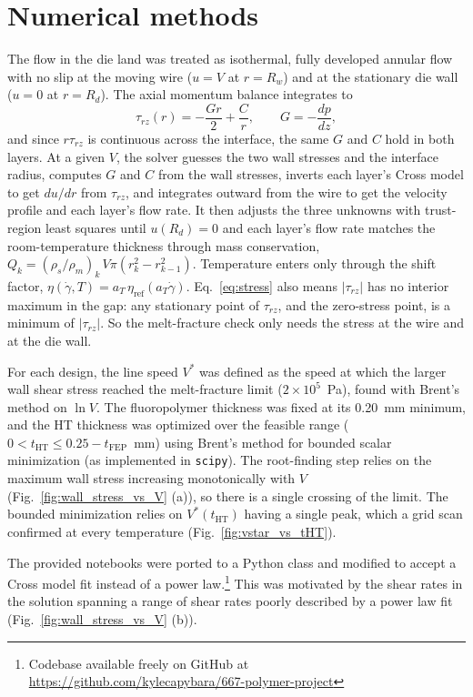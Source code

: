 \documentclass[11pt]{article}
\begin{document}
\section*{Numerical methods}

The flow in the die land was treated as isothermal, fully developed annular flow with no slip at the moving wire ($u = V$ at $r = R_w$) and at the stationary die wall ($u = 0$ at $r = R_d$). The axial momentum balance integrates to
\begin{equation}
    \tau_{rz}(r) = -\frac{G r}{2} + \frac{C}{r}, \qquad G = -\frac{dp}{dz},
    \label{eq:stress}
\end{equation}
and since $r\tau_{rz}$ is continuous across the interface, the same $G$ and $C$ hold in both layers. At a given $V$, the solver guesses the two wall stresses and the interface radius, computes $G$ and $C$ from the wall stresses, inverts each layer's Cross model to get $du/dr$ from $\tau_{rz}$, and integrates outward from the wire to get the velocity profile and each layer's flow rate. It then adjusts the three unknowns with trust-region least squares until $u(R_d) = 0$ and each layer's flow rate matches the room-temperature thickness through mass conservation, $Q_k = (\rho_s/\rho_m)_k\,V\pi(r_k^2 - r_{k-1}^2)$. Temperature enters only through the shift factor, $\eta(\dot\gamma, T) = a_T\,\eta_\text{ref}(a_T\dot\gamma)$. Eq.~\ref{eq:stress} also means $|\tau_{rz}|$ has no interior maximum in the gap: any stationary point of $\tau_{rz}$, and the zero-stress point, is a minimum of $|\tau_{rz}|$. So the melt-fracture check only needs the stress at the wire and at the die wall.

For each design, the line speed $V^*$ was defined as the speed at which the larger wall shear stress reached the melt-fracture limit ($2\times10^{5}$~Pa), found with Brent's method on $\ln V$. The fluoropolymer thickness was fixed at its 0.20~mm minimum, and the HT thickness was optimized over the feasible range ($0 < t_\text{HT} \le 0.25 - t_\text{FEP}$~mm) using Brent's method\cite{brent_algorithms_2002} for bounded scalar minimization (as implemented in \texttt{scipy}\cite{2020SciPy-NMeth}). The root-finding step relies on the maximum wall stress increasing monotonically with $V$ (Fig.~\ref{fig:wall_stress_vs_V} (a)), so there is a single crossing of the limit. The bounded minimization relies on $V^*(t_\text{HT})$ having a single peak, which a grid scan confirmed at every temperature (Fig.~\ref{fig:vstar_vs_tHT}).

The provided notebooks were ported to a Python class and modified to accept a Cross model fit instead of a power law.\footnote{Codebase available freely on GitHub at \hyperlink{https://github.com/kylecapybara/667-polymer-project}{https://github.com/kylecapybara/667-polymer-project}} This was motivated by the shear rates in the solution spanning a range of shear rates poorly described by a power law fit (Fig.~\ref{fig:wall_stress_vs_V} (b)).
\end{document}

